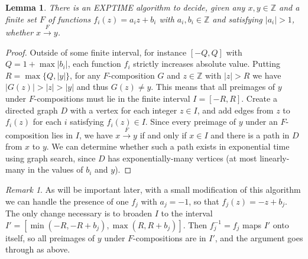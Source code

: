 \documentclass[11pt]{amsart}
\newcommand{\Z}{\mathbb{Z}}
\newtheorem{lemma}{Lemma}
\theoremstyle{definition}
\theoremstyle{remark}
\newtheorem*{remark}{Remark}
\begin{document}
\begin{lemma} \label{expanding-reachable}
There is an \textsf{EXPTIME} algorithm to decide, given any $x, y \in \Z$ and a finite set $F$ of functions $f_i(z) = a_i z + b_i$ with $a_i, b_i \in \Z$ and satisfying $|a_i| > 1$, whether $x \xrightarrow{F} y$.
\end{lemma}
\begin{proof}
Outside of some finite interval, for instance $[-Q,Q]$ with $Q = 1 + \max |b_i|$, each function $f_i$ strictly increases absolute value. Putting $R = \max \{Q, |y|\}$, for any $F$-composition $G$ and $z \in \Z$ with $|z| > R$ we have $|G(z)| > |z| > |y|$ and thus $G(z) \ne y$. This means that all preimages of $y$ under $F$-compositions must lie in the finite interval $I = [-R,R]$. Create a directed graph $D$ with a vertex for each integer $z \in I$, and add edges from $z$ to $f_i(z)$ for each $i$ satisfying $f_i(z) \in I$. Since every preimage of $y$ under an $F$-composition lies in $I$, we have $x \xrightarrow{F} y$ if and only if $x \in I$ and there is a path in $D$ from $x$ to $y$. We can determine whether such a path exists in exponential time using graph search, since $D$ has exponentially-many vertices (at most linearly-many in the values of $b_i$ and $y$).
\end{proof}
\begin{remark}
As will be important later, with a small modification of this algorithm we can handle the presence of one $f_j$ with $a_j = -1$, so that $f_j(z) = -z+b_j$. The only change necessary is to broaden $I$ to the interval $I' = [\min(-R,-R+b_j), \max(R,R+b_j)]$. Then $f_j^{-1} = f_j$ maps $I'$ onto itself, so all preimages of $y$ under $F$-compositions are in $I'$, and the argument goes through as above.
\end{remark}
\end{document}
